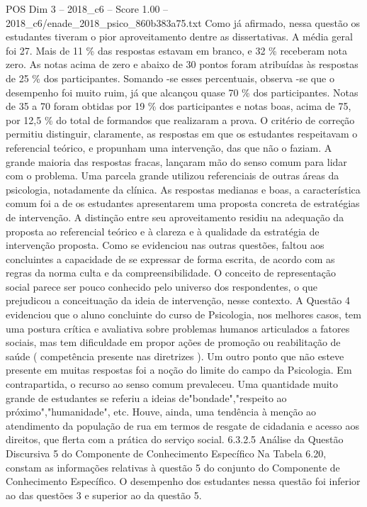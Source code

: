 \begin{textsample}{POS Dim 3 – 2018\_c6 – Score 1.00 – 2018\_c6/enade\_2018\_psico\_860b383a75.txt}
Como já afirmado, nessa questão os estudantes tiveram o pior aproveitamento dentre as dissertativas.
A média geral foi 27.
Mais de 11 \% das respostas estavam em branco, e 32 \% receberam nota zero.
As notas acima de zero e abaixo de 30 pontos foram atribuídas às respostas de 25 \% dos participantes.
Somando -se esses percentuais, observa -se que o desempenho foi muito ruim, já que alcançou quase 70 \% dos participantes.
Notas de 35 a 70 foram obtidas por 19 \% dos participantes e notas boas, acima de 75, por 12,5 \% do total de formandos que realizaram a prova.
O critério de correção permitiu distinguir, claramente, as respostas em que os estudantes respeitavam o referencial teórico, e propunham uma intervenção, das que não o faziam.
A grande maioria das respostas fracas, lançaram mão do senso comum para lidar com o problema.
Uma parcela grande utilizou referenciais de outras áreas da psicologia, notadamente da clínica.
As respostas medianas e boas, a característica comum foi a de os estudantes apresentarem uma proposta concreta de estratégias de intervenção.
A distinção entre seu aproveitamento residiu na adequação da proposta ao referencial teórico e à clareza e à qualidade da estratégia de intervenção proposta.
Como se evidenciou nas outras questões, faltou aos concluintes a capacidade de se expressar de forma escrita, de acordo com as regras da norma culta e da compreensibilidade.
O conceito de representação social parece ser pouco conhecido pelo universo dos respondentes, o que prejudicou a conceituação da ideia de intervenção, nesse contexto.
A Questão 4 evidenciou que o aluno concluinte do curso de Psicologia, nos melhores casos, tem uma postura crítica e avaliativa sobre problemas humanos articulados a fatores sociais, mas tem dificuldade em propor ações de promoção ou reabilitação de saúde ( competência presente nas diretrizes ).
Um outro ponto que não esteve presente em muitas respostas foi a noção do limite do campo da Psicologia.
Em contrapartida, o recurso ao senso comum prevaleceu.
Uma quantidade muito grande de estudantes se referiu a ideias de"bondade","respeito ao próximo","humanidade", etc.
Houve, ainda, uma tendência à menção ao atendimento da população de rua em termos de resgate de cidadania e acesso aos direitos, que flerta com a prática do serviço social. 6.3.2.5 Análise da Questão Discursiva 5 do Componente de Conhecimento Específico Na Tabela 6.20, constam as informações relativas à questão 5 do conjunto do Componente de Conhecimento Específico.
O desempenho dos estudantes nessa questão foi inferior ao das questões 3 e superior ao da questão 5.

\end{textsample}

